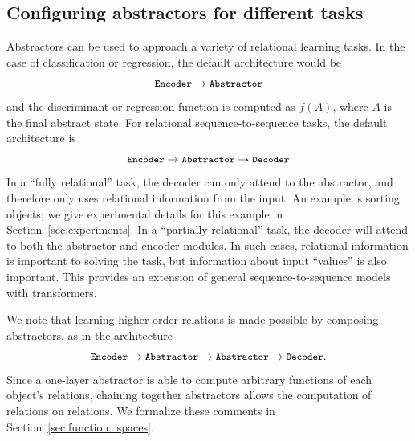 \subsection{Configuring abstractors for different tasks}
\def\module#1{\mbox{\small\texttt{#1}}}

Abstractors can be used to approach a variety of relational learning tasks. In the case of classification
or regression, the default architecture would be
$$\module{Encoder} \rightarrow \module{Abstractor}$$
and the discriminant or regression function is computed as $f(A)$, where $A$ is the final abstract state.
For relational sequence-to-sequence tasks, the default architecture is
$$\module{Encoder} \rightarrow \module{Abstractor} \rightarrow \module{Decoder}$$
In a ``fully relational'' task, the decoder can only attend to the abstractor, and therefore
only uses relational information from the input. An example is sorting objects; we give
experimental details for this example in Section~\ref{sec:experiments}.
In a ``partially-relational'' task, the decoder will attend to both the abstractor and encoder modules. In such cases, relational information is important to solving the task, but information about input ``values'' is
also important. This provides an extension of general sequence-to-sequence models with transformers.


We note that learning higher order relations is made possible by composing
abstractors, as in the architecture
$$\module{Encoder} \rightarrow \module{Abstractor} \rightarrow \module{Abstractor} \rightarrow \module{Decoder}.$$
Since a one-layer abstractor is able to compute arbitrary functions of each object's relations,
chaining together abstractors allows the computation of relations on relations. We formalize
these comments in Section~\ref{sec:function_spaces}.

